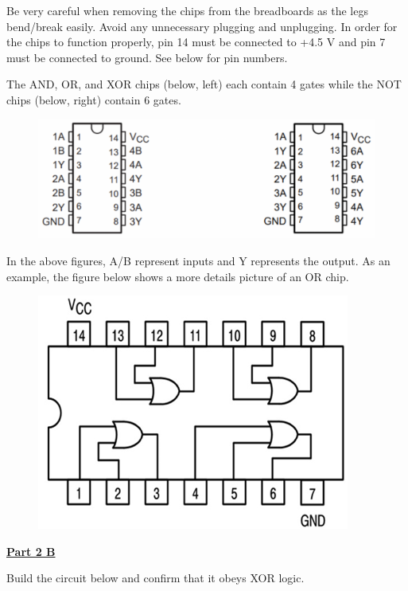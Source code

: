 Be very careful when removing the chips from the breadboards as the legs bend/break easily.
Avoid any unnecessary plugging and unplugging.
In order for the chips to function properly, pin 14 must be connected to +4.5 V and pin 7 must be connected to ground.
See below for pin numbers.

\vspace{\baselineskip}

The AND, OR, and XOR chips (below, left) each contain 4 gates while the NOT chips (below, right) contain 6 gates. 

\begin{figure}[H]
\includegraphics[scale=0.50]{figures/logic-circuits/fig3.png}
\end{figure}

In the above figures, A/B represent inputs and Y represents the output.
As an example, the figure below shows a more details picture of an OR chip.

\begin{figure}[H]
\includegraphics[scale=0.85]{figures/logic-circuits/fig4.png}
\end{figure}

\underline{\textbf{Part 2 B}} \par

Build the circuit below and confirm that it obeys XOR logic.

